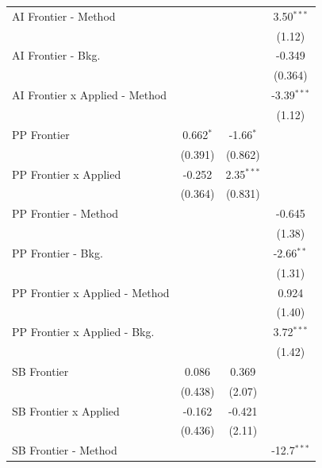\begin{tabular}{lccc}
   AI Frontier - Method           &             &               & 3.50$^{***}$\\   
                                  &             &               & (1.12)\\   
   AI Frontier - Bkg.             &             &               & -0.349\\   
                                  &             &               & (0.364)\\   
   AI Frontier x Applied - Method &             &               & -3.39$^{***}$\\   
                                  &             &               & (1.12)\\   
   PP Frontier                    & 0.662$^{*}$ & -1.66$^{*}$   &   \\   
                                  & (0.391)     & (0.862)       &   \\   
   PP Frontier x Applied          & -0.252      & 2.35$^{***}$  &   \\   
                                  & (0.364)     & (0.831)       &   \\   
   PP Frontier - Method           &             &               & -0.645\\   
                                  &             &               & (1.38)\\   
   PP Frontier - Bkg.             &             &               & -2.66$^{**}$\\   
                                  &             &               & (1.31)\\   
   PP Frontier x Applied - Method &             &               & 0.924\\   
                                  &             &               & (1.40)\\   
   PP Frontier x Applied - Bkg.   &             &               & 3.72$^{***}$\\   
                                  &             &               & (1.42)\\   
   SB Frontier                    & 0.086       & 0.369         &   \\   
                                  & (0.438)     & (2.07)        &   \\   
   SB Frontier x Applied          & -0.162      & -0.421        &   \\   
                                  & (0.436)     & (2.11)        &   \\   
   SB Frontier - Method           &             &               & -12.7$^{***}$\\   

\end{tabular}
